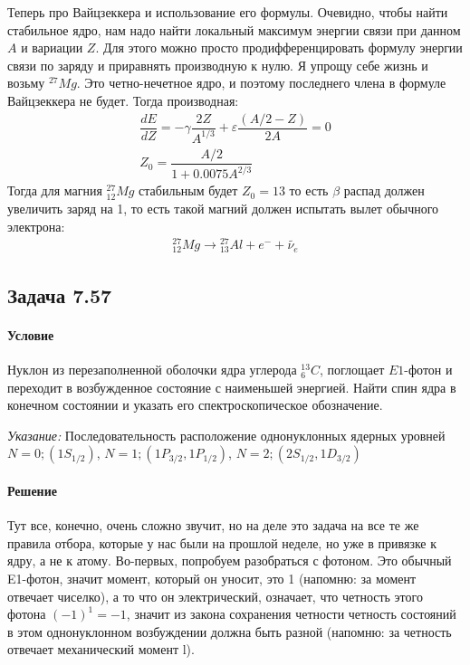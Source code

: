 \documentclass[12pt]{article}
\begin{document}
\vspace{1em} \noindent
Теперь про Вайцзеккера и использование его формулы. Очевидно, чтобы найти стабильное ядро, нам надо найти локальный максимум энергии связи при данном $A$ и вариации $Z$. Для этого можно просто продифференцировать формулу энергии связи по заряду и приравнять производную к нулю. Я упрощу себе жизнь и возьму ${}^{27}Mg$. Это четно-нечетное ядро, и поэтому последнего члена в формуле Вайцзеккера не будет. Тогда производная:
\begin{gather*}
    \dfrac{dE}{dZ} = -\gamma \dfrac{2Z}{A^{1/3}} + \varepsilon \dfrac{(A/2-Z)}{2A} = 0\\
    Z_0 = \dfrac{A/2}{1 + 0.0075 A^{2/3}}
\end{gather*}
Тогда для магния ${}^{27}_{12}Mg$ стабильным будет $Z_0=13$ то есть $\beta$ распад должен увеличить заряд на 1, то есть такой магний должен испытать вылет обычного электрона:
 \begin{gather*}
     {}^{27}_{12}Mg \rightarrow {}^{27}_{13}Al + e^- + \widetilde{\nu_e}
\end{gather*}

\subsection{Задача 7.57}
\label{task_2}
\paragraph{Условие}
Нуклон из перезаполненной оболочки ядра углерода ${}^{13}_6C$, поглощает $E1$-фотон и переходит в возбужденное состояние с наименьшей энергией. Найти спин ядра в конечном состоянии и указать его спектроскопическое обозначение.

\vspace{1em} \noindent
\textit{Указание:} Последовательность расположение однонуклонных ядерных уровней $N=0;(1S_{1/2})$, $N=1;(1P_{3/2}, 1P_{1/2})$, $N=2;(2S_{1/2}, 1D_{3/2})$
\paragraph{Решение}
Тут все, конечно, очень сложно звучит, но на деле это задача на все те же правила отбора, которые у нас были на прошлой неделе, но уже в привязке к ядру, а не к атому. Во-первых, попробуем разобраться с фотоном. Это обычный E1-фотон, значит момент, который он уносит, это 1 (напомню: за момент отвечает чиселко), а то что он электрический, означает, что четность этого фотона $(-1)^1 = -1$, значит из закона сохранения четности четность состояний в этом однонуклонном возбуждении должна быть разной (напомню: за четность отвечает механический момент l).
\end{document}
